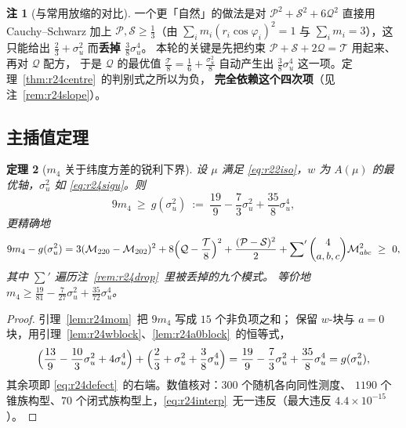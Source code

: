 \documentclass[UTF8,11pt]{ctexart}
\newtheorem{theorem}{定理}[section]
\theoremstyle{definition}
\newtheorem{remark}[theorem]{注}
\begin{document}
\begin{remark}[与常用放缩的对比]\label{rem:r24noscale}
一个更「自然」的做法是对 $\mathcal{P}^2+\mathcal{S}^2+6\mathcal{Q}^2$ 直接用
Cauchy--Schwarz 加上 $\mathcal{P},\mathcal{S}\ge\frac13$（由 $\sum_im_i(r_i\cos\varphi_i)^2=1$ 与
$\sum_im_i=3$），这只能给出 $\frac23+\sigma_u^2$ 而\textbf{丢掉 $\frac38\sigma_u^4$}。
本轮的关键是先把约束 $\mathcal{P}+\mathcal{S}+2\mathcal{Q}=\mathcal{T}$ 用起来、再对 $\mathcal{Q}$ 配方，
于是 $\mathcal{Q}$ 的最优值 $\frac{\mathcal{T}}8=\frac16+\frac{\sigma_u^2}8$ 自动产生出
$\frac38\sigma_u^4$ 这一项。定理~\ref{thm:r24centre}~的判别式之所以为负，
\textbf{完全依赖这个四次项}（见注~\ref{rem:r24slope}）。
\end{remark}

\subsection{主插值定理}\label{sec:r24:interp}

\begin{theorem}[$m_4$ 关于纬度方差的锐利下界]\label{thm:r24interp}
设 $\mu$ 满足 \eqref{eq:r22iso}，$w$ 为 $A(\mu)$ 的最优轴，$\sigma_u^2$ 如 \eqref{eq:r24sigu}。则
\begin{equation}\label{eq:r24interp}
9m_4\ \ge\ g(\sigma_u^2)\ :=\ \frac{19}9-\frac73\sigma_u^2+\frac{35}8\sigma_u^4 ,
\end{equation}
更精确地
\begin{equation}\label{eq:r24defect}
9m_4-g(\sigma_u^2)=3(\mathcal{M}_{220}-\mathcal{M}_{202})^2
+8\Bigl(\mathcal{Q}-\frac{\mathcal{T}}8\Bigr)^2+\frac{(\mathcal{P}-\mathcal{S})^2}2
+\sum\nolimits'\binom{4}{a,b,c}\mathcal{M}_{abc}^2\ \ge\ 0 ,
\end{equation}
其中 $\sum'$ 遍历注~\ref{rem:r24drop}~里被丢掉的九个模式。
等价地 $m_4\ge\frac{19}{81}-\frac{7}{27}\sigma_u^2+\frac{35}{72}\sigma_u^4$。
\end{theorem}

\begin{proof}
引理~\ref{lem:r24mom}~把 $9m_4$ 写成 $15$ 个非负项之和；
保留 $w$-块与 $a{=}0$ 块，用引理~\ref{lem:r24wblock}、\ref{lem:r24a0block}~的恒等式，
\[
\Bigl(\frac{13}9-\frac{10}3\sigma_u^2+4\sigma_u^4\Bigr)+\Bigl(\frac23+\sigma_u^2+\frac38\sigma_u^4\Bigr)
=\frac{19}9-\frac73\sigma_u^2+\frac{35}8\sigma_u^4=g(\sigma_u^2),
\]
其余项即 \eqref{eq:r24defect}~的右端。数值核对：$300$ 个随机各向同性测度、
$1190$ 个锥族构型、$70$ 个闭式族构型上，\eqref{eq:r24interp}~无一违反（最大违反 $4.4\times10^{-15}$）。
\end{proof}
\end{document}
